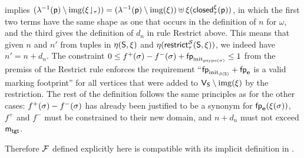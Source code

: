 \begin{proofE}
\begin{itemize}
      implies $(\lambda^{-1}(\mathsf{p}) \setminus
      {\mathrm{img}({{\xi}\!\downharpoonleft_{\tau}})}) = (\lambda^{-1}(\mathsf{p}) \setminus
      {\mathrm{img}({\xi})}) \uplus
      \xi(\mathsf{closed}^{\xi}_{\tau}({\mathsf{p}}))$, in which the
      first two terms have the same shape as one that occurs in the
      definition of $n$ for $\omega$, and the third gives the
      definition of $d_n$ in rule Restrict above.  This means that
      given $n$ and $n'$ from tuples in $\eta(\mathsf{S},\xi)$ and
      $\eta(\mathsf{restrict}^{\mathcal{S}}_{{\tau}}(\mathsf{S},\xi))$, we indeed
      have $n' = n + d_n$.  The constraint $0 \leq f^+(\sigma) -
      f^-(\sigma) + \mathsf{fp}_{\mathrm{init}_{{\mathrm{ptype}({\sigma})}}} \leq 1$ from
      the premiss of the Restrict rule enforces the requirement
      ``$\mathsf{fp}_{\mathrm{init}_{\beta({\mathsf{S}})}} + \mathsf{fp}_{\mathbf{e}}$ is a
      valid marking footprint'' for all vertices that were added to
      $\mathsf{V}_{\mathsf{S}}\setminus{\mathrm{img}({\xi})}$ by the restriction.  The
      rest of the definition follows the same principles as for the
      other cases: $f^+(\sigma) - f^-(\sigma)$ has already been
      justified to be a synonym for $\mathsf{fp}_{\mathbf{e}}(\xi(\sigma))$,
      $f^+$ and $f^-$ must be constrained to their new domain, and $n
      + d_n$ must not exceed $\mathsf{m}_\mathsf{tgt}$.
  \end{itemize}
  Therefore $\mathcal{F}$ defined explicitly here is compatible
  with its implicit definition in .


\end{proofE}
